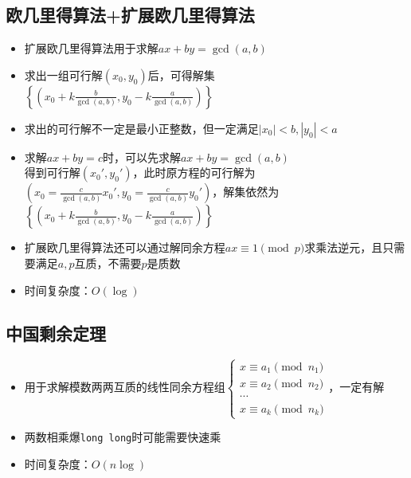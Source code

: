 \documentclass[twocolumn,a4,8pt]{article}  %
\begin{document}
	 	\subsection{欧几里得算法+扩展欧几里得算法}	 	
	 		\noindent\begin{itemize}
	 			\item 扩展欧几里得算法用于求解$ax+by=\gcd(a,b)$
	 			\item 求出一组可行解$(x_0,y_0)$后，可得解集\\ $\left\{\left(x_0+k\frac{b}{\gcd(a,b)},y_0-k\frac{a}{\gcd(a,b)}\right)\right\}$
	 			\item 求出的可行解不一定是最小正整数，但一定满足$|x_0|<b,|y_0|<a$
	 			\item 求解$ax+by=c$时，可以先求解$ax+by=\gcd(a,b)$\\ 得到可行解$(x_0',y_0')$，此时原方程的可行解为\\ $\left(x_0=\frac{c}{\gcd(a,b)}x_0',y_0=\frac{c}{\gcd(a,b)}y_0'\right)$，解集依然为\\ $\left\{\left(x_0+k\frac{b}{\gcd(a,b)},y_0-k\frac{a}{\gcd(a,b)}\right)\right\}$
	 			\item 扩展欧几里得算法还可以通过解同余方程$ax\equiv 1\pmod p$求乘法逆元，且只需要满足$a,p$互质，不需要$p$是质数
		 		\item 时间复杂度：$O(\log)$
	 		\end{itemize}
	 	 	
	
	 	\subsection{中国剩余定理}
	 		\noindent\begin{itemize}
	 			\item 用于求解模数两两互质的线性同余方程组$\begin{cases}x\equiv a_1\pmod{n_1}\\x\equiv a_2\pmod{n_2}\\\cdots\\x\equiv a_k\pmod{n_k}\end{cases}$，一定有解
	 			\item 两数相乘爆\texttt{long long}时可能需要快速乘
		 		\item 时间复杂度：$O(n\log)$
	 		\end{itemize}
	 	 	
	
\end{document}

